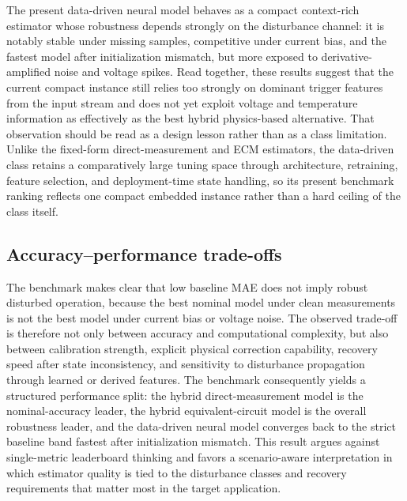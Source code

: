 \documentclass[review,nopreprintline]{elsarticle}
\begin{document}
The present data-driven neural model behaves as a compact context-rich estimator whose robustness depends strongly on the disturbance channel: it is notably stable under missing samples, competitive under current bias, and the fastest model after initialization mismatch, but more exposed to derivative-amplified noise and voltage spikes. Read together, these results suggest that the current compact instance still relies too strongly on dominant trigger features from the input stream and does not yet exploit voltage and temperature information as effectively as the best hybrid physics-based alternative. That observation should be read as a design lesson rather than as a class limitation. Unlike the fixed-form direct-measurement and ECM estimators, the data-driven class retains a comparatively large tuning space through architecture, retraining, feature selection, and deployment-time state handling, so its present benchmark ranking reflects one compact embedded instance rather than a hard ceiling of the class itself.

\subsection{Accuracy--performance trade-offs}
The benchmark makes clear that low baseline MAE does not imply robust disturbed operation, because the best nominal model under clean measurements is not the best model under current bias or voltage noise. The observed trade-off is therefore not only between accuracy and computational complexity, but also between calibration strength, explicit physical correction capability, recovery speed after state inconsistency, and sensitivity to disturbance propagation through learned or derived features. The benchmark consequently yields a structured performance split: the hybrid direct-measurement model is the nominal-accuracy leader, the hybrid equivalent-circuit model is the overall robustness leader, and the data-driven neural model converges back to the strict baseline band fastest after initialization mismatch. This result argues against single-metric leaderboard thinking and favors a scenario-aware interpretation in which estimator quality is tied to the disturbance classes and recovery requirements that matter most in the target application.
\end{document}
